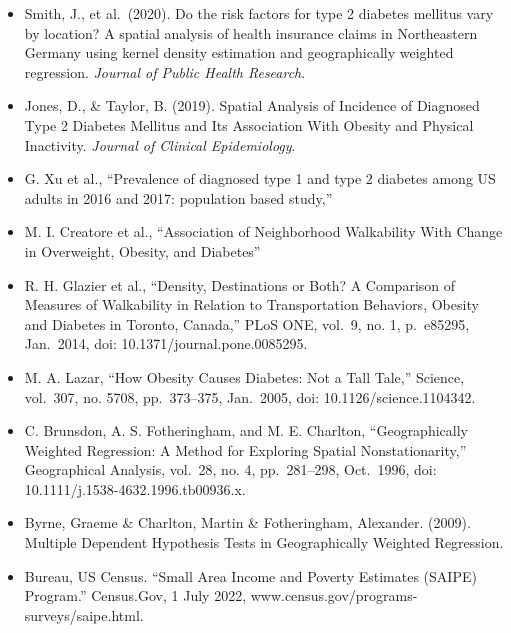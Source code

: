 \documentclass[
]{article}
\providecommand{\tightlist}{%
  \setlength{\itemsep}{0pt}\setlength{\parskip}{0pt}}\usepackage{longtable,booktabs,array}
\begin{document}
\begin{itemize}
\tightlist
\item
  Smith, J., et al.~(2020). Do the risk factors for type 2 diabetes
  mellitus vary by location? A spatial analysis of health insurance
  claims in Northeastern Germany using kernel density estimation and
  geographically weighted regression. \emph{Journal of Public Health
  Research}.
\item
  Jones, D., \& Taylor, B. (2019). Spatial Analysis of Incidence of
  Diagnosed Type 2 Diabetes Mellitus and Its Association With Obesity
  and Physical Inactivity. \emph{Journal of Clinical Epidemiology}.
\item
  G. Xu et al., ``Prevalence of diagnosed type 1 and type 2 diabetes
  among US adults in 2016 and 2017: population based study,''
\item
  M. I. Creatore et al., ``Association of Neighborhood Walkability With
  Change in Overweight, Obesity, and Diabetes''
\item
  R. H. Glazier et al., ``Density, Destinations or Both? A Comparison of
  Measures of Walkability in Relation to Transportation Behaviors,
  Obesity and Diabetes in Toronto, Canada,'' PLoS ONE, vol.~9, no. 1,
  p.~e85295, Jan.~2014, doi: 10.1371/journal.pone.0085295.
\item
  M. A. Lazar, ``How Obesity Causes Diabetes: Not a Tall Tale,''
  Science, vol.~307, no. 5708, pp.~373--375, Jan.~2005, doi:
  10.1126/science.1104342.
\item
  C. Brunsdon, A. S. Fotheringham, and M. E. Charlton, ``Geographically
  Weighted Regression: A Method for Exploring Spatial Nonstationarity,''
  Geographical Analysis, vol.~28, no. 4, pp.~281--298, Oct.~1996, doi:
  10.1111/j.1538-4632.1996.tb00936.x.
\item
  Byrne, Graeme \& Charlton, Martin \& Fotheringham, Alexander. (2009).
  Multiple Dependent Hypothesis Tests in Geographically Weighted
  Regression.
\item
  Bureau, US Census. ``Small Area Income and Poverty Estimates (SAIPE)
  Program.'' Census.Gov, 1 July 2022,
  www.census.gov/programs-surveys/saipe.html.
\end{itemize}
\end{document}
